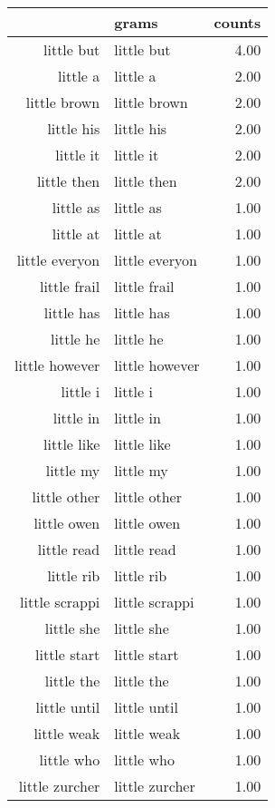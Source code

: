 \begin{table}[ht]
\centering
\begin{tabular}{rlr}
  \hline
 & grams & counts \\ 
  \hline
little but & little but & 4.00 \\ 
  little a & little a & 2.00 \\ 
  little brown & little brown & 2.00 \\ 
  little his & little his & 2.00 \\ 
  little it & little it & 2.00 \\ 
  little then & little then & 2.00 \\ 
  little as & little as & 1.00 \\ 
  little at & little at & 1.00 \\ 
  little everyon & little everyon & 1.00 \\ 
  little frail & little frail & 1.00 \\ 
  little has & little has & 1.00 \\ 
  little he & little he & 1.00 \\ 
  little however & little however & 1.00 \\ 
  little i & little i & 1.00 \\ 
  little in & little in & 1.00 \\ 
  little like & little like & 1.00 \\ 
  little my & little my & 1.00 \\ 
  little other & little other & 1.00 \\ 
  little owen & little owen & 1.00 \\ 
  little read & little read & 1.00 \\ 
  little rib & little rib & 1.00 \\ 
  little scrappi & little scrappi & 1.00 \\ 
  little she & little she & 1.00 \\ 
  little start & little start & 1.00 \\ 
  little the & little the & 1.00 \\ 
  little until & little until & 1.00 \\ 
  little weak & little weak & 1.00 \\ 
  little who & little who & 1.00 \\ 
  little zurcher & little zurcher & 1.00 \\ 
   \hline
\end{tabular}
\end{table}
